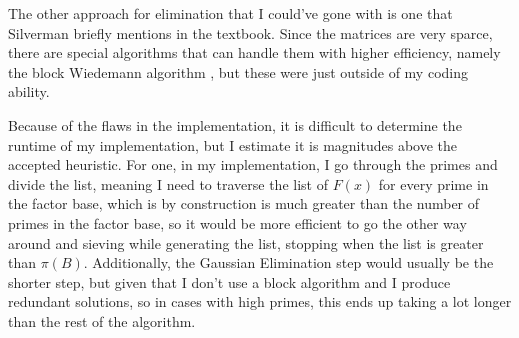 \documentclass[11pt,reqno]{amsart}
\theoremstyle{definition}
\begin{document}
The other approach for elimination that I could've gone with is one that Silverman briefly mentions in the textbook. Since the matrices are very sparce, there are special algorithms that can handle them with higher efficiency, namely the block Wiedemann algorithm \cite{coppersmith1994solving}, but these were just outside of my coding ability.

Because of the flaws in the implementation, it is difficult to determine the runtime of my implementation, but I estimate it is magnitudes above the accepted heuristic. For one, in my implementation, I go through the primes and divide the list, meaning I need to traverse the list of $F(x)$ for every prime in the factor base, which is by construction is much greater than the number of primes in the factor base, so it would be more efficient to go the other way around and sieving while generating the list, stopping when the list is greater than $\pi(B)$. Additionally, the Gaussian Elimination step would usually be the shorter step, but given that I don't use a block algorithm and I produce redundant solutions, so in cases with high primes, this ends up taking a lot longer than the rest of the algorithm.



\end{document}
